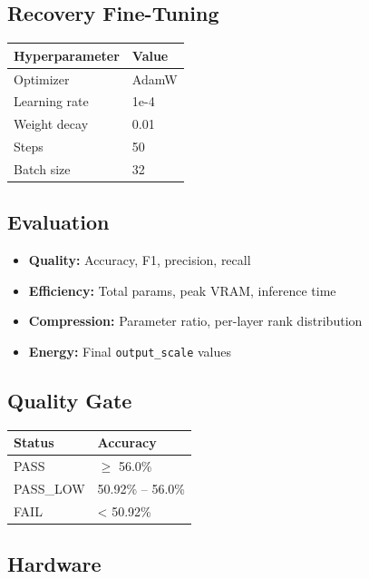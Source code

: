 \subsection{Recovery Fine-Tuning}

\begin{table}[H]
\centering
\small
\begin{tabular}{ll}
\toprule
\textbf{Hyperparameter} & \textbf{Value} \\
\midrule
Optimizer & AdamW \\
Learning rate & 1e-4 \\
Weight decay & 0.01 \\
Steps & 50 \\
Batch size & 32 \\
\bottomrule
\end{tabular}
\end{table}

\subsection{Evaluation}

\begin{itemize}
\item \textbf{Quality:} Accuracy, F1, precision, recall
\item \textbf{Efficiency:} Total params, peak VRAM, inference time
\item \textbf{Compression:} Parameter ratio, per-layer rank distribution
\item \textbf{Energy:} Final \texttt{output\_scale} values

\end{itemize}
\subsection{Quality Gate}

\begin{table}[H]
\centering
\small
\begin{tabular}{ll}
\toprule
\textbf{Status} & \textbf{Accuracy} \\
\midrule
PASS & $\ge$ 56.0\% \\
PASS\_LOW & 50.92\% -- 56.0\% \\
FAIL & \textless{} 50.92\% \\
\bottomrule
\end{tabular}
\end{table}

\subsection{Hardware}

